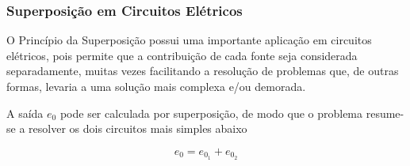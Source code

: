 \documentclass{article}
\numberwithin{equation}{section}
\newlength\Colsep
\begin{document}
\subsubsection{Superposição em Circuitos Elétricos}
O Princípio da Superposição possui uma importante aplicação em circuitos elétricos, pois permite que a contribuição de cada fonte seja considerada separadamente, muitas vezes facilitando a resolução de problemas que, de outras formas, levaria a uma solução mais complexa e/ou demorada.

\begin{center}
\end{center}

A saída $e_0$ pode ser calculada por superposição, de modo que o problema resume-se a resolver os dois circuitos mais simples abaixo

$$e_0=e_{0_1}+e_{0_2}$$

\noindent\begin{minipage}{\textwidth}
\begin{minipage}[c][5cm][c]{\dimexpr0.5\textwidth-0.5\Colsep\relax}
    \begin{center}
    \end{center}
\end{minipage} \hfill
\begin{minipage}[c][5cm][c]{\dimexpr0.5\textwidth-0.5\Colsep\relax}
    \begin{center}
    \end{center}
\end{minipage}
\end{minipage}
\end{document}
